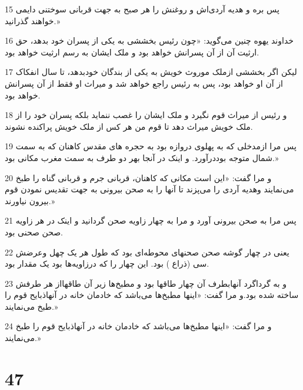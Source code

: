 \par 15 پس بره و هدیه آردی‌اش و روغنش را هر صبح به جهت قربانی سوختنی دایمی خواهند گذرانید.»
\par 16 خداوند یهوه چنین می‌گوید: «چون رئیس بخششی به یکی از پسران خود بدهد، حق ارثیت آن از آن پسرانش خواهد بود و ملک ایشان به رسم ارثیت خواهد بود.
\par 17 لیکن اگر بخششی ازملک موروث خویش به یکی از بندگان خودبدهد، تا سال انفکاک از آن او خواهد بود، پس به رئیس راجع خواهد شد و میراث او فقط از آن پسرانش خواهد بود.
\par 18 و رئیس از میراث قوم نگیرد و ملک ایشان را غصب ننماید بلکه پسران خود را از ملک خویش میراث دهد تا قوم من هر کس از ملک خویش پراکنده نشوند.
\par 19 پس مرا ازمدخلی که به پهلوی دروازه بود به حجره های مقدس کاهنان که به سمت شمال متوجه بوددرآورد. و اینک در آنجا بهر دو طرف به سمت مغرب مکانی بود.»
\par 20 و مرا گفت: «این است مکانی که کاهنان، قربانی جرم و قربانی گناه را طبخ می‌نمایند وهدیه آردی را می‌پزند تا آنها را به صحن بیرونی به جهت تقدیس نمودن قوم بیرون نیاورند.»
\par 21 پس مرا به صحن بیرونی آورد و مرا به چهار زاویه صحن گردانید و اینک در هر زاویه صحن صحنی بود.
\par 22 یعنی در چهار گوشه صحن صحنهای محوطه‌ای بود که طول هر یک چهل وعرضش سی (ذراع ) بود. این چهار را که درزاویه‌ها بود یک مقدار بود.
\par 23 و به گرداگرد آنهابطرف آن چهار طاقها بود و مطبخ‌ها زیر آن طاقهااز هر طرفش ساخته شده بود.و مرا گفت: «اینها مطبخ‌ها می‌باشد که خادمان خانه در آنهاذبایح قوم را طبخ می‌نمایند.»
\par 24 و مرا گفت: «اینها مطبخ‌ها می‌باشد که خادمان خانه در آنهاذبایح قوم را طبخ می‌نمایند.»

\chapter{47}

